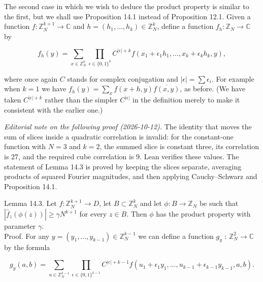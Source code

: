 \documentclass[10pt]{article}
\begin{document}
The second case in which we wish to deduce the product property is similar to the first, but we shall use Proposition 14.1 instead of Proposition 12.1. Given a function $f: \mathbb{Z}_{N}^{k+1} \rightarrow \mathbb{C}$ and $h=\left(h_{1}, \ldots, h_{k}\right) \in \mathbb{Z}_{N}^{k}$, define a function $f_{h}: \mathbb{Z}_{N} \rightarrow \mathbb{C}$ by

$$
f_{h}(y)=\sum_{x \in \mathbb{Z}_{N}^{k}} \prod_{\epsilon \in\{0,1\}^{k}} C^{|\epsilon|+k} f\left(x_{1}+\epsilon_{1} h_{1}, \ldots, x_{k}+\epsilon_{k} h_{k}, y\right),
$$

where once again $C$ stands for complex conjugation and $|\epsilon|=\sum \epsilon_{i}$. For example when $k=1$ we have $f_{h}(y)=\sum_{x} f(x+h, y) \overline{f(x, y)}$, as before. (We have taken $C^{|\epsilon|+k}$ rather than the simpler $C^{|\epsilon|}$ in the definition merely to make it consistent with the earlier one.)

\emph{Editorial note on the following proof (2026-10-12).}
The identity that moves the sum of slices inside a quadratic correlation
is invalid: for the constant-one function with $N=3$ and $k=2$, the
summed slice is constant three, its correlation is $27$, and the required
cube correlation is $9$. Lean verifies these values. The statement of
Lemma 14.3 is proved by keeping the slices separate, averaging products
of squared Fourier magnitudes, and then applying Cauchy--Schwarz and
Proposition 14.1.

Lemma 14.3. Let $f: \mathbb{Z}_{N}^{k+1} \rightarrow D$, let $B \subset \mathbb{Z}_{N}^{k}$ and let $\phi: B \rightarrow \mathbb{Z}_{N}$ be such that $\left|\hat{f}_{z}(\phi(z))\right| \geqslant \gamma N^{k+1}$ for every $z \in B$. Then $\phi$ has the product property with parameter $\gamma$.\\
Proof. For any $y=\left(y_{1}, \ldots, y_{k-1}\right) \in \mathbb{Z}_{N}^{k-1}$ we can define a function $g_{y}$ : $\mathbb{Z}_{N}^{2} \rightarrow \mathbb{C}$ by the formula

$$
g_{y}(a, b)=\sum_{u \in \mathbb{Z}_{N}^{k-1}} \prod_{\epsilon \in\{0,1\}^{k-1}} C^{|\epsilon|+k-1} f\left(u_{1}+\epsilon_{1} y_{1}, \ldots, u_{k-1}+\epsilon_{k-1} y_{k-1}, a, b\right) .
$$
\end{document}
